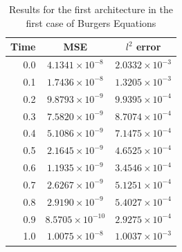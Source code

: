 \documentclass[12pt,letterpaper]{article}
\begin{document}
\begin{table}[H]
  \begin{center}
  \begin{tabular}{ r | c  c }
  \textbf{Time} & \textbf{MSE} & \textbf{$l^2$ error} \\ \hline
  0.0 & $ 4.1341\times 10^{-8}$ & $ 2.0332\times 10^{-3} $ \\
  0.1 & $ 1.7436\times 10^{-8}$ & $ 1.3205\times 10^{-3} $ \\
  0.2 & $ 9.8793\times 10^{-9}$ & $ 9.9395\times 10^{-4} $ \\
  0.3 & $ 7.5820\times 10^{-9}$ & $ 8.7074\times 10^{-4} $ \\
  0.4 & $ 5.1086\times 10^{-9}$ & $ 7.1475\times 10^{-4} $ \\
  0.5 & $ 2.1645\times 10^{-9}$ & $ 4.6525\times 10^{-4} $ \\
  0.6 & $ 1.1935\times 10^{-9}$ & $ 3.4546\times 10^{-4} $ \\
  0.7 & $ 2.6267\times 10^{-9}$ & $ 5.1251\times 10^{-4} $ \\
  0.8 & $ 2.9190\times 10^{-9}$ & $ 5.4027\times 10^{-4} $ \\
  0.9 & $ 8.5705\times 10^{-10}$ & $ 2.9275\times 10^{-4} $ \\
  1.0 & $ 1.0075\times 10^{-8}$ & $ 1.0037\times 10^{-3} $ \\
  \end{tabular}
  \caption{Results for the first architecture in the first case of Burgers Equations}
  \label{tab:B11}
  \end{center}
  \end{table}
\end{document}
